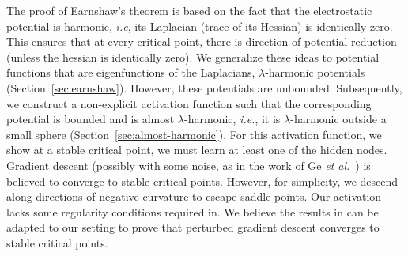 
The proof of Earnshaw's theorem is based on the fact that the electrostatic potential is harmonic, \emph{i.e}, its Laplacian (trace of its Hessian) is identically zero. This ensures that at every critical point, there is direction of potential reduction (unless the hessian is identically zero). We generalize these ideas to potential functions that are eigenfunctions of the Laplacians, $\lambda$-harmonic potentials (Section~\ref{sec:earnshaw}). However, these potentials are unbounded. Subsequently, we construct a non-explicit activation function such that the corresponding potential is bounded and is almost $\lambda$-harmonic, \emph{i.e.}, it is $\lambda$-harmonic outside a small sphere (Section~\ref{sec:almost-harmonic}). For this activation function, we show at a stable critical point, we must learn at least one of the hidden nodes. Gradient descent (possibly with some noise, as in the work of Ge \emph{et al.}~\cite{GeHJY15}) is believed to converge to stable critical points. However, for simplicity, we descend along directions of negative curvature to escape saddle points. Our activation lacks some regularity conditions required in\cite{GeHJY15}. We believe the results in \cite{jin2017escape} can be adapted to our setting to prove that perturbed gradient descent converges to stable critical points.





